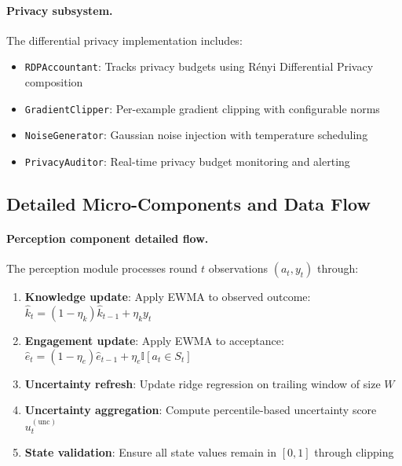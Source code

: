 \paragraph{Privacy subsystem.} The differential privacy implementation includes:
\begin{itemize}
  \item \texttt{RDPAccountant}: Tracks privacy budgets using Rényi Differential Privacy composition
  \item \texttt{GradientClipper}: Per-example gradient clipping with configurable norms
  \item \texttt{NoiseGenerator}: Gaussian noise injection with temperature scheduling
  \item \texttt{PrivacyAuditor}: Real-time privacy budget monitoring and alerting
\end{itemize}

\subsection{Detailed Micro-Components and Data Flow}
\label{app:micro-components}

\paragraph{Perception component detailed flow.} The perception module processes round $t$ observations $(a_t, y_t)$ through:
\begin{enumerate}
  \item \textbf{Knowledge update}: Apply EWMA to observed outcome: $\widehat{k}_t = (1-\eta_k)\widehat{k}_{t-1} + \eta_k y_t$
  \item \textbf{Engagement update}: Apply EWMA to acceptance: $\widehat{e}_t = (1-\eta_e)\widehat{e}_{t-1} + \eta_e \mathbb{I}[a_t \in S_t]$  
  \item \textbf{Uncertainty refresh}: Update ridge regression on trailing window of size $W$
  \item \textbf{Uncertainty aggregation}: Compute percentile-based uncertainty score $u_t^{(\mathrm{unc})}$
  \item \textbf{State validation}: Ensure all state values remain in $[0,1]$ through clipping
\end{enumerate}

